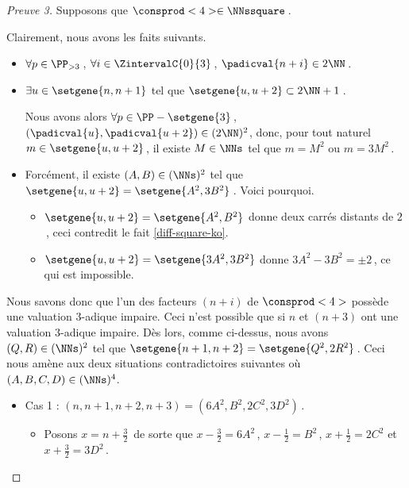 	
\begin{proof}[Preuve 3]
    Supposons que $\consprod<4> \in \NNssquare$\,.
    
    \smallskip
    
	Clairement, nous avons les faits suivants.
    \begin{itemize}
    	\item  
		$\forall p \in \PP_{>3}$\,, 
   		$\forall i \in \ZintervalC{0}{3}$\,, 
    	$\padicval{n + i} \in 2 \NN$\,.
	
	
		\item $\exists u \in \setgene{n, n+1}$ tel que $\setgene{u, u + 2} \subset 2 \NN + 1$\,.
		
		\noindent
		Nous avons alors
		$\forall p \in \PP - \setgene{3}$\,, 
   		$(\padicval{u}, \padicval{u+2}) \in ( 2 \NN )^2$,
		donc, pour tout naturel $m \in \setgene{u, u + 2}$\,, 
		il existe $M \in \NNs$ tel que 
		$m = M^2$ ou $m = 3 M^2$\,.
	
	
		\item Forcément, il existe $(A, B) \in ( \NNs )^2$ tel que 
        $\setgene{u, u + 2} = \setgene{A^2, 3 B^2}$\,. Voici pourquoi.
        \begin{itemize}
        	\item $\setgene{u, u + 2} = \setgene{A^2, B^2}$ donne deux carrés distants de $2$\,, ceci contredit le fait \ref{diff-square-ko}.

        	\item $\setgene{u, u + 2} = \setgene{3 A^2, 3 B^2}$ donne $3 A^2 - 3 B^2 = \pm 2$\,, ce qui est impossible.
        \end{itemize}
    \end{itemize}

    \smallskip
	
	Nous savons donc que l'un des facteurs $(n+i)$ de $\consprod<4>$ possède une valuation $3$-adique impaire. Ceci n'est possible que si $n$ et $(n+3)$ ont une valuation $3$-adique impaire.
	Dès lors, comme ci-dessus, nous avons $(Q, R) \in ( \NNs )^2$ tel que $\setgene{n+1, n+2} = \setgene{Q^2, 2 R^2}$\,.
	Ceci nous amène aux deux situations contradictoires suivantes où $(A, B, C, D) \in ( \NNs )^4$.
	
    \begin{itemize}
    	\item Cas 1 : $(n, n+1, n+2, n+3) = (6A^2, B^2, 2C^2, 3D^2)$\,.
		\begin{itemize}
        	\item Posons $x = n + \frac32$\, de sorte que 
        	$x - \frac32 = 6 A^2$\,, $x - \frac12 = B^2$\,, $x + \frac12 = 2 C^2$ et $x + \frac32 = 3 D^2$\,.
        

\end{itemize}
\end{itemize}
\end{proof}
